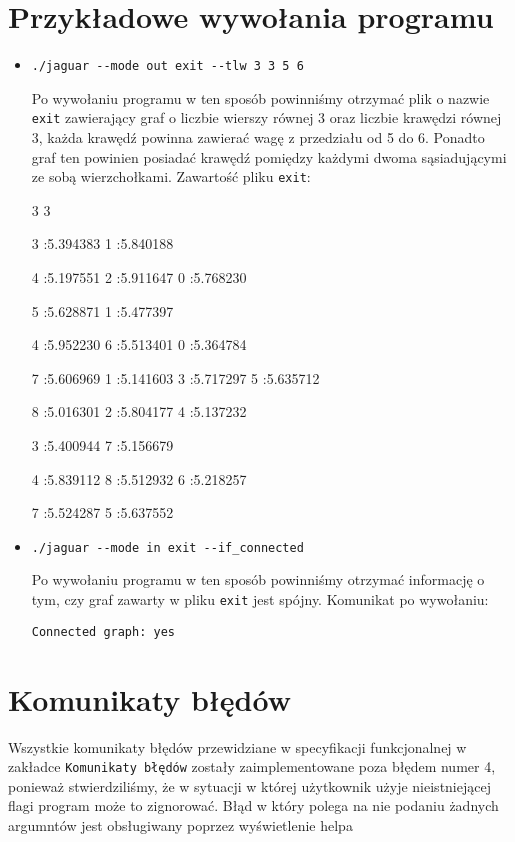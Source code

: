 \documentclass[]{article}
\begin{document}
\section{Przykładowe wywołania programu}\label{header-n279}
\begin{itemize}
\item
\verb|./jaguar --mode out exit --tlw 3 3 5 6| 

Po wywołaniu programu w ten sposób powinniśmy otrzymać plik o nazwie \texttt{exit} zawierający graf o liczbie wierszy równej 3 oraz liczbie krawędzi równej 3, każda krawędź powinna zawierać wagę z przedziału od 5 do 6. Ponadto graf ten powinien posiadać krawędź pomiędzy każdymi dwoma sąsiadującymi ze sobą wierzchołkami. Zawartość pliku \texttt{exit}:

3 3

         3 :5.394383  1 :5.840188

         4 :5.197551  2 :5.911647  0 :5.768230
 
        5 :5.628871  1 :5.477397

         4 :5.952230  6 :5.513401  0 :5.364784

         7 :5.606969  1 :5.141603  3 :5.717297  5 :5.635712

         8 :5.016301  2 :5.804177  4 :5.137232

         3 :5.400944  7 :5.156679

         4 :5.839112  8 :5.512932  6 :5.218257

         7 :5.524287  5 :5.637552

\item
\verb|./jaguar --mode in exit --if_connected|

Po wywołaniu programu w ten sposób powinniśmy otrzymać informację o tym, czy graf zawarty w pliku \texttt{exit} jest spójny. Komunikat po wywołaniu:

\verb|Connected graph: yes|
\end{itemize}
\section{Komunikaty błędów}\label{header-n279}
Wszystkie komunikaty błędów przewidziane w specyfikacji funkcjonalnej w zakładce \texttt{Komunikaty błędów} zostały zaimplementowane poza błędem numer 4, ponieważ stwierdziliśmy, że w sytuacji w której użytkownik użyje nieistniejącej flagi program może to zignorować. Błąd w który polega na nie podaniu żadnych argumntów jest obsługiwany poprzez wyświetlenie helpa
\end{document}
